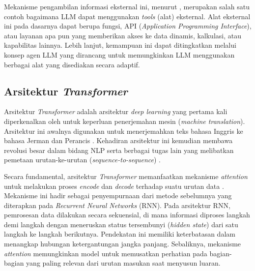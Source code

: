 Mekanisme pengambilan informasi eksternal ini, menurut \textcite{minaeeLargeLanguageModels2025}, merupakan salah satu contoh bagaimana LLM dapat menggunakan \textit{tools} (alat) eksternal. Alat eksternal ini pada dasarnya dapat berupa fungsi, API (\textit{Application Programming Interface}), atau layanan apa pun yang memberikan akses ke data dinamis, kalkulasi, atau kapabilitas lainnya. Lebih lanjut, kemampuan ini dapat ditingkatkan melalui konsep agen LLM yang dirancang untuk memungkinkan LLM menggunakan berbagai alat yang disediakan secara adaptif. 


\subsection{Arsitektur \textit{Transformer}}
Arsitektur \textit{Transformer} adalah arsitektur \textit{deep learning} yang pertama kali diperkenalkan oleh \textcite{vaswaniAttentionAllYou2023} untuk keperluan penerjemahan mesin (\textit{machine translation}).
Arsitektur ini awalnya digunakan untuk menerjemahkan teks bahasa Inggris ke bahasa Jerman dan Perancis \parencite{raschkaBuildLargeLanguage2025}. Kehadiran arsitektur ini kemudian membawa revolusi besar dalam bidang NLP serta berbagai tugas lain yang melibatkan pemetaan urutan-ke-urutan (\textit{sequence-to-sequence}) \parencite{altoBuildingLLMPowerd2024}. 

Secara fundamental, arsitektur \textit{Transformer} memanfaatkan mekanisme \textit{attention} untuk melakukan proses \textit{encode} dan \textit{decode} terhadap suatu urutan data \parencite{altoBuildingLLMPowerd2024}. Mekanisme ini hadir sebagai penyempurnaan dari metode sebelumnya yang diterapkan pada \textit{Recurrent Neural Networks} (RNN). Pada arsitektur RNN, pemrosesan data dilakukan secara sekuensial, di mana informasi diproses langkah demi langkah dengan meneruskan status tersembunyi (\textit{hidden state}) dari satu langkah ke langkah berikutnya. Pendekatan ini memiliki keterbatasan dalam menangkap hubungan ketergantungan jangka panjang. Sebaliknya, mekanisme \textit{attention} memungkinkan model untuk memusatkan perhatian pada bagian-bagian yang paling relevan dari urutan masukan saat menyusun luaran. 

